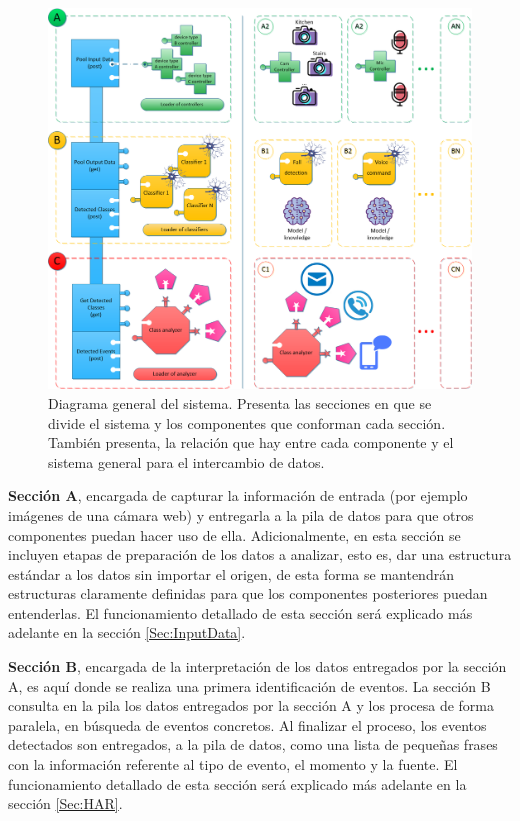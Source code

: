     \begin{figure}[ht!]
    	\centering
    	\includegraphics[width=0.8\linewidth]{imgs/03-Architecture/03-Architecture.png}
    	\caption[Diagrama general del sistema]{Diagrama general del sistema. Presenta las secciones en que se divide el sistema y los componentes que conforman cada sección. También presenta, la relación que hay entre cada componente y el sistema general para el intercambio de datos.}
	    \label{fig:Architecture}
    \end{figure}%

    \textbf{Sección A}, encargada de capturar la información de entrada (por ejemplo imágenes de una cámara web) y entregarla a la pila de datos para que otros componentes puedan hacer uso de ella. Adicionalmente, en esta sección se incluyen etapas de preparación de los datos a analizar, esto es, dar una estructura estándar a los datos sin importar el origen, de esta forma se mantendrán estructuras claramente definidas para que los componentes posteriores puedan entenderlas. El funcionamiento detallado de esta sección será explicado más adelante en la sección \ref{Sec:InputData}.

    \textbf{Sección B}, encargada de la interpretación de los datos entregados por la sección A, es aquí donde se realiza una primera identificación de eventos. La sección B consulta en la pila los datos entregados por la sección A y los procesa de forma paralela, en búsqueda de eventos concretos. Al finalizar el proceso, los eventos detectados son entregados, a la pila de datos, como una lista de pequeñas frases con la información referente al tipo de evento, el momento y la fuente. El funcionamiento detallado de esta sección será explicado más adelante en la sección \ref{Sec:HAR}.

